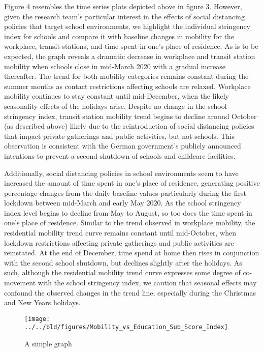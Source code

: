 Figure 4 resembles the time series plots depicted above in figure 3. However, given the research team’s particular interest in the effects of social distancing policies that target school environments, we highlight the individual stringency index for schools and compare it with baseline changes in mobility for the workplace, transit stations, and time spent in one’s place of residence. As is to be expected, the graph reveals a dramatic decrease in workplace and transit station mobility when schools close in mid-March 2020 with a gradual increase thereafter. The trend for both mobility categories remains constant during the summer months as contact restrictions affecting schools are relaxed. Workplace mobility continues to stay constant until mid-December, when the likely seasonality effects of the holidays arise. Despite no change in the school stringency index, transit station mobility trend begins to decline around October (as described above) likely due to the reintroduction of social distancing policies that impact private gatherings and public activities, but not schools. This observation is consistent with the German government’s publicly announced intentions to prevent a second shutdown of schools and childcare facilities.

Additionally, social distancing policies in school environments seem to have increased the amount of time spent in one’s place of residence, generating positive percentage changes from the daily baseline values particularly during the first lockdown between mid-March and early May 2020. As the school stringency index level begins to decline from May to August, so too does the time spent in one’s place of residence. Similar to the trend observed in workplace mobility, the residential mobility trend curve remains constant until mid-October, when lockdown restrictions affecting private gatherings and public activities are reinstated. At the end of December, time spend at home then rises in conjunction with the second school shutdown, but declines slightly after the holidays. As such, although the residential mobility trend curve expresses some degree of co-movement with the school stringency index, we caution that seasonal effects may confound the observed changes in the trend line, especially during the Christmas and New Years holidays.

\begin{figure}[H]
      \centering
      \texttt{[image: ../../bld/figures/Mobility\_vs\_Education\_Sub\_Score\_Index]}
      \label{fig:five over x}
      \caption{A simple graph}
      \label{fig:simplegraph}
\end{figure}

